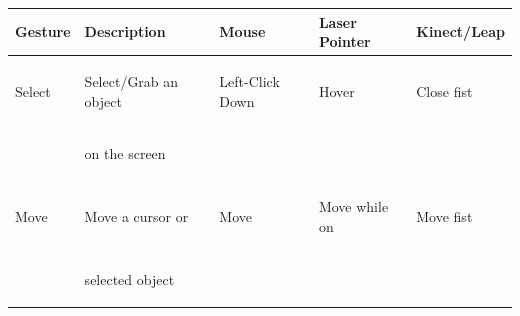 \documentclass[runningheads,a4paper]{llncs}
\begin{document}
\begin{table}[t]
 \begin{center}
 \begin{tabular}{| l | l | l | l | l |} 
  \hline
  \textbf{Gesture} & \textbf{Description} & \textbf{Mouse} & \textbf{Laser Pointer} & \textbf{Kinect/Leap} \\
  \hline
  \begin{tiny}Select               \end{tiny}&\begin{tiny}Select/Grab an object\end{tiny}&\begin{tiny}Left-Click Down\end{tiny}&\begin{tiny}Hover         \end{tiny}&\begin{tiny}Close fist       \end{tiny}\vspace{-0.05in}\\
  \begin{tiny}                     \end{tiny}&\begin{tiny}on the screen        \end{tiny}&\begin{tiny}               \end{tiny}&\begin{tiny}              \end{tiny}&\begin{tiny}                 \end{tiny}\vspace{-0.02in}\\ \hline
  \begin{tiny}Move                 \end{tiny}&\begin{tiny}Move a cursor or     \end{tiny}&\begin{tiny}Move           \end{tiny}&\begin{tiny}Move while on \end{tiny}&\begin{tiny}Move fist        \end{tiny}\vspace{-0.05in}\\
  \begin{tiny}                     \end{tiny}&\begin{tiny}selected object      \end{tiny}&\begin{tiny}               \end{tiny}&\begin{tiny}              \end{tiny}&\begin{tiny}                 \end{tiny}\vspace{-0.02in}\\ \hline

\end{tabular}
\end{center}
\end{table}
\end{document}
